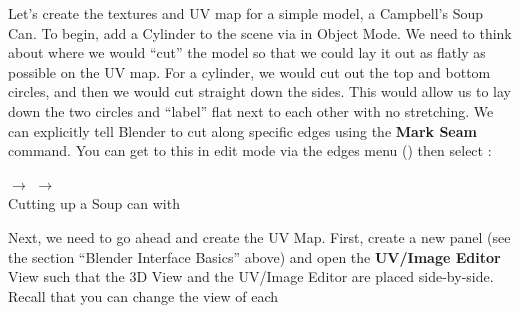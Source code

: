\documentclass[11pt]{article}
\begin{document}
Let's create the textures and UV map for a simple model, a Campbell's Soup Can.  To begin, add a
Cylinder to the scene via  in Object Mode.  We need to think about where we
would ``cut'' the model so that we could lay it out as flatly as possible on the UV map.  For a
cylinder, we would cut out the top and bottom circles, and then we would cut straight down the sides.
This would allow us to lay down the two circles and ``label'' flat next to each other with no 
stretching.  We can explicitly tell Blender to cut along specific edges using the \textbf{Mark Seam}
command.  You can get to this in edit mode via the edges menu () then select 
:
\begin{center}
     $\rightarrow$
     $\rightarrow$
     \\
    Cutting up a Soup can with 
\end{center}
Next, we need to go ahead and create the UV Map.  First, create a new panel (see the section 
``Blender Interface Basics'' above) and open the \textbf{UV/Image Editor} View such that the 3D
View and the UV/Image Editor are placed side-by-side.  Recall that you can change the view of each
\end{document}

